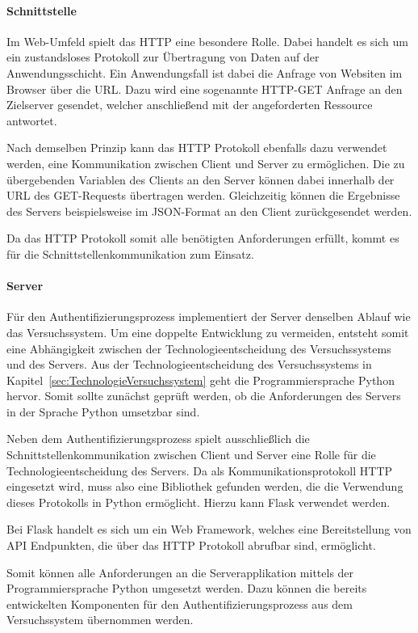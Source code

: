 \paragraph{Schnittstelle}
Im Web-Umfeld spielt das \ac{HTTP} eine besondere Rolle.
Dabei handelt es sich um ein zustandsloses Protokoll zur Übertragung von Daten auf der Anwendungsschicht.
Ein Anwendungsfall ist dabei die Anfrage von Websiten im Browser über die URL.
Dazu wird eine sogenannte \ac{HTTP}-GET Anfrage an den Zielserver gesendet, welcher anschließend mit der angeforderten Ressource antwortet.

Nach demselben Prinzip kann das HTTP Protokoll ebenfalls dazu verwendet werden, eine Kommunikation zwischen Client und Server zu ermöglichen.
Die zu übergebenden Variablen des Clients an den Server können dabei innerhalb der URL des GET-Requests übertragen werden.
Gleichzeitig können die Ergebnisse des Servers beispielsweise im JSON-Format an den Client zurückgesendet werden.

Da das HTTP Protokoll somit alle benötigten Anforderungen erfüllt, kommt es für die Schnittstellenkommunikation zum Einsatz.

\paragraph{Server}
Für den Authentifizierungsprozess implementiert der Server denselben Ablauf wie das Versuchssystem.
Um eine doppelte Entwicklung zu vermeiden, entsteht somit eine Abhängigkeit zwischen der Technologieentscheidung des Versuchssystems und des Servers.
Aus der Technologieentscheidung des Versuchssystems in Kapitel~\ref{sec:TechnologieVersuchssystem} geht die Programmiersprache Python hervor.
Somit sollte zunächst geprüft werden, ob die Anforderungen des Servers in der Sprache Python umsetzbar sind.

Neben dem Authentifizierungsprozess spielt ausschließlich die Schnittstellenkommunikation zwischen Client und Server eine Rolle für die Technologieentscheidung des Servers.
Da als Kommunikationsprotokoll HTTP eingesetzt wird, muss also eine Bibliothek gefunden werden, die die Verwendung dieses Protokolls in Python ermöglicht.
Hierzu kann Flask verwendet werden.

Bei Flask handelt es sich um ein Web Framework, welches eine Bereitstellung von \ac{API} Endpunkten, die über das \ac{HTTP} Protokoll abrufbar sind, ermöglicht.

Somit können alle Anforderungen an die Serverapplikation mittels der Programmiersprache Python umgesetzt werden.
Dazu können die bereits entwickelten Komponenten für den Authentifizierungsprozess aus dem Versuchssystem übernommen werden.


